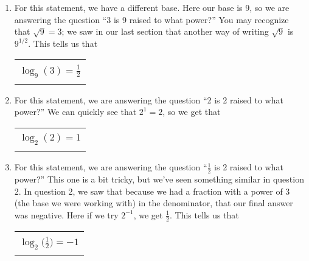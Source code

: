 {\begin{enumerate}
			\begin{center}
		\begin{tabular}{| c |} \hline
			\\[-4pt]
			$\displaystyle \log_3{\Bigg(\frac{1}{9} \Bigg)} =-2 $ \\[-4pt]
			\\\hline
		\end{tabular}
	\end{center}
\item For this statement, we have a different base. Here our base is 9, so we are answering the question ``3 is 9 raised to what power?'' You may recognize that $\sqrt{9}=3$; we saw in our last section that another way of writing $\sqrt{9}$ is $9^{1/2}$. This tells us that 
		\begin{center}
		\begin{tabular}{| c |} \hline
			\\[-4pt]
			$\displaystyle \log_9{(3)} = \frac{1}{2}$ \\[-4pt]
			\\\hline
		\end{tabular}
	\end{center}
	\item For this statement, we are answering the question ``2 is 2 raised to what power?'' We can quickly see that $2^1=2$, so we get that 	\begin{center}
		\begin{tabular}{| c |} \hline
			\\[-4pt]
			$\displaystyle \log_2{(2)} =1 $ \\[-4pt]
			\\\hline
		\end{tabular}
	\end{center}
\item For this statement, we are answering the question ``$\frac{1}{2}$ is 2 raised to what power?'' This one is a bit tricky, but we've seen something similar in question 2. In question 2, we saw that because we had a fraction with a power of 3 (the base we were working with) in the denominator, that our final answer was negative. Here if we try $2^{-1}$, we get $\frac{1}{2}$. This tells us that 
			\begin{center}
		\begin{tabular}{| c |} \hline
			\\[-4pt]
			$\displaystyle \log_2{\Bigg( \frac{1}{2} \Bigg)}= -1$ \\[-4pt]
			\\\hline
		\end{tabular}

\end{center}
\end{enumerate}}
